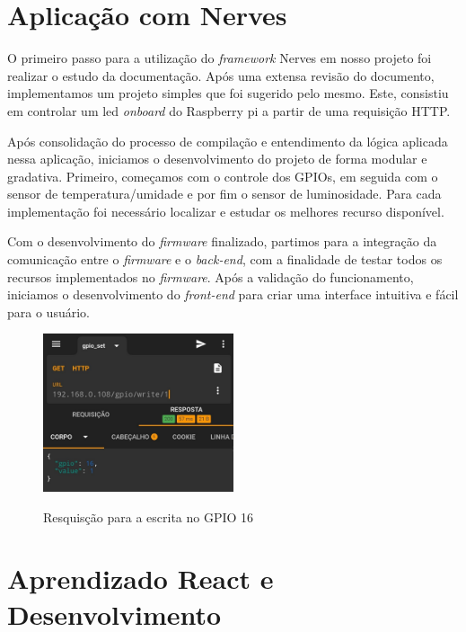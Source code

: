 \documentclass[../../layout.tex]{subfiles}
\begin{document}
\section{Aplicação com Nerves}
\hspace*{3em}O primeiro passo para a utilização do \emph{framework} Nerves em nosso projeto foi realizar o estudo da documentação. Após uma extensa revisão do documento, implementamos um projeto simples que foi sugerido pelo mesmo. Este, consistiu em controlar um led \emph{onboard} do Raspberry pi a partir de uma requisição HTTP.\par
Após consolidação do processo de compilação e entendimento da lógica aplicada nessa aplicação, iniciamos o desenvolvimento do projeto de forma modular e gradativa. Primeiro, começamos com o controle dos GPIOs, em seguida com o sensor de temperatura/umidade e por fim o sensor de luminosidade. Para cada implementação  foi necessário localizar e estudar os melhores recurso disponível.\par 
Com o desenvolvimento do \emph{firmware} finalizado, partimos para a integração da comunicação entre o \emph{firmware} e o \emph{back-end}, com a finalidade de testar todos os recursos implementados no \emph{firmware}. Após a validação do funcionamento, iniciamos o desenvolvimento do \emph{front-end} para criar uma interface intuitiva e fácil para o usuário.

\begin{figure}[H]
\centering
\caption{Resquisção para a escrita no GPIO 16}
\includegraphics[width=0.5\textwidth]{assets/static/img/request.jpg}
\label{fig:request_gpio}
\begin{minipage}{0.5\textwidth}
\end{minipage}
\end{figure}


\section{Aprendizado React e Desenvolvimento}
\end{document}
